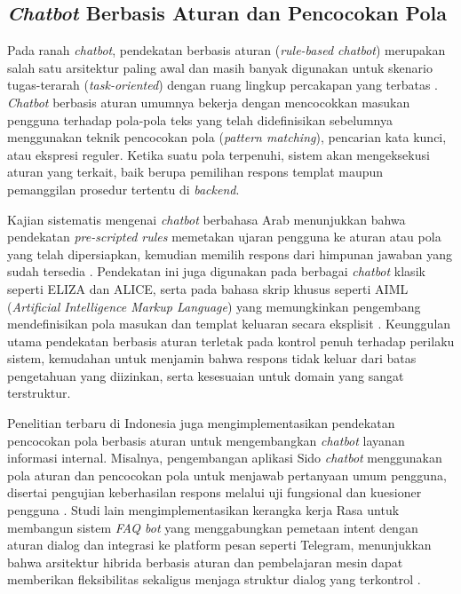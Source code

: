\subsection{\textit{Chatbot} Berbasis Aturan dan Pencocokan Pola}

Pada ranah \textit{chatbot}, pendekatan berbasis aturan (\textit{rule-based chatbot}) merupakan salah satu arsitektur paling awal dan masih banyak digunakan untuk skenario tugas-terarah (\textit{task-oriented}) dengan ruang lingkup percakapan yang terbatas \autocite{Singh2025ChatbotsSurvey,Ouali2024ArabicChatbots}. \textit{Chatbot} berbasis aturan umumnya bekerja dengan mencocokkan masukan pengguna terhadap pola-pola teks yang telah didefinisikan sebelumnya menggunakan teknik pencocokan pola (\textit{pattern matching}), pencarian kata kunci, atau ekspresi reguler. Ketika suatu pola terpenuhi, sistem akan mengeksekusi aturan yang terkait, baik berupa pemilihan respons templat maupun pemanggilan prosedur tertentu di \textit{backend}.

Kajian sistematis mengenai \textit{chatbot} berbahasa Arab menunjukkan bahwa pendekatan \textit{pre-scripted rules} memetakan ujaran pengguna ke aturan atau pola yang telah dipersiapkan, kemudian memilih respons dari himpunan jawaban yang sudah tersedia \autocite{Ouali2024ArabicChatbots}. Pendekatan ini juga digunakan pada berbagai \textit{chatbot} klasik seperti ELIZA dan ALICE, serta pada bahasa skrip khusus seperti AIML (\textit{Artificial Intelligence Markup Language}) yang memungkinkan pengembang mendefinisikan pola masukan dan templat keluaran secara eksplisit \autocite{Singh2025ChatbotsSurvey}. Keunggulan utama pendekatan berbasis aturan terletak pada kontrol penuh terhadap perilaku sistem, kemudahan untuk menjamin bahwa respons tidak keluar dari batas pengetahuan yang diizinkan, serta kesesuaian untuk domain yang sangat terstruktur.

Penelitian terbaru di Indonesia juga mengimplementasikan pendekatan pencocokan pola berbasis aturan untuk mengembangkan \textit{chatbot} layanan informasi internal. Misalnya, pengembangan aplikasi Sido \textit{chatbot} menggunakan pola aturan dan pencocokan pola untuk menjawab pertanyaan umum pengguna, disertai pengujian keberhasilan respons melalui uji fungsional dan kuesioner pengguna \autocite{Ananta2025SidoChatbot}. Studi lain mengimplementasikan kerangka kerja Rasa untuk membangun sistem \textit{FAQ bot} yang menggabungkan pemetaan intent dengan aturan dialog dan integrasi ke platform pesan seperti Telegram, menunjukkan bahwa arsitektur hibrida berbasis aturan dan pembelajaran mesin dapat memberikan fleksibilitas sekaligus menjaga struktur dialog yang terkontrol \autocite{Talenggoran2025RasaFAQ}.

